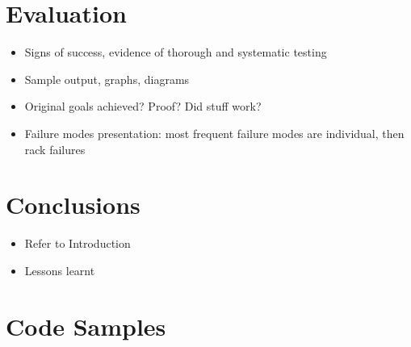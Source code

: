 \documentclass[11pt,chapterprefix=true,toc=bibliography,numbers=noendperiod]{scrreprt}
\begin{document}
\chapter{Evaluation\label{ch:evaluation}}

\begin{itemize}
    \item Signs of success, evidence of thorough and systematic testing
    \item Sample output, graphs, diagrams
    \item Original goals achieved? Proof? Did stuff work?
\end{itemize}

\begin{itemize}
    \item Failure modes presentation: most frequent failure modes are individual, then rack failures
\end{itemize}

\chapter{Conclusions\label{ch:conclusions}}

\begin{itemize}
    \item Refer to Introduction
    \item Lessons learnt
\end{itemize}

\printbibliography


\appendix

\chapter{Code Samples\label{ch:code-samples}}
\end{document}
